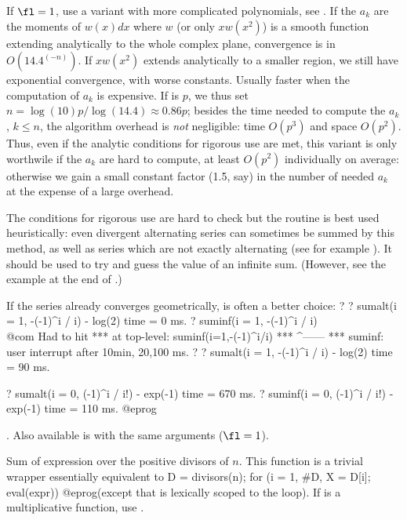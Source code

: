 If $\fl=1$, use a variant with more complicated polynomials, see
. If the $a_k$ are the moments of $w(x)dx$ where $w$
(or only $xw(x^2)$) is a smooth function extending analytically to the whole
complex plane, convergence is in $O(14.4^(-n))$. If $xw(x^2)$ extends
analytically to a smaller region, we still have exponential convergence,
with worse constants. Usually faster when the computation of $a_k$ is
expensive. If  is $p$, we thus set
$n = \log(10)p/\log(14.4)\approx 0.86 p$; besides the time needed to
compute the $a_k$, $k\leq n$, the algorithm overhead is \emph{not}
negligible: time $O(p^3)$ and space $O(p^2)$. Thus, even if the analytic
conditions for rigorous use are met, this variant is only worthwile if the
$a_k$ are hard to compute, at least $O(p^2)$ individually on average:
otherwise we gain a small constant factor (1.5, say) in the number of
needed $a_k$ at the expense of a large overhead.

The conditions for rigorous use are hard to check but the routine is best used
heuristically: even divergent alternating series can sometimes be summed by
this method, as well as series which are not exactly alternating (see for
example ). It should be used to try and guess the
value of an infinite sum. (However, see the example at the end of
.)

If the series already converges geometrically,
 is often a better choice:
\bprog
? 
? sumalt(i = 1, -(-1)^i / i)  - log(2)
time = 0 ms.
? suminf(i = 1, -(-1)^i / i)   \\@com Had to hit 
  ***   at top-level: suminf(i=1,-(-1)^i/i)
  ***                                ^------
  *** suminf: user interrupt after 10min, 20,100 ms.
? 
? sumalt(i = 1, -(-1)^i / i)  - log(2)
time = 90 ms.

? sumalt(i = 0, (-1)^i / i!) - exp(-1)
time = 670 ms.
? suminf(i = 0, (-1)^i / i!) - exp(-1)
time = 110 ms.
@eprog

. Also
available is  with the same arguments ($\fl = 1$).

\label{se:sumdiv}
Sum of expression  over the positive divisors of $n$.
This function is a trivial wrapper essentially equivalent to
\bprog
  D = divisors(n);
  for (i = 1, #D, X = D[i]; eval(expr))
@eprog\noindent (except that  is lexically scoped to the 
loop). If  is a multiplicative function, use .

